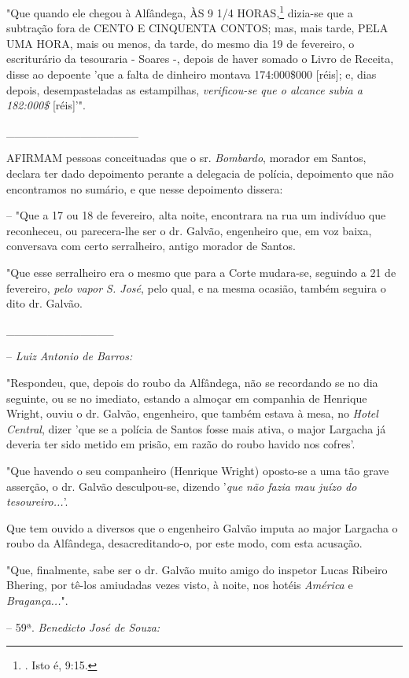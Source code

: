 "Que quando ele chegou à Alfândega, ÀS 9 1/4 HORAS,\footnote{. Isto é,
  9:15.} dizia-se que a subtração fora de CENTO E CINQUENTA CONTOS; mas,
mais tarde, PELA UMA HORA, mais ou menos, da tarde, do mesmo dia 19 de
fevereiro, o escriturário da tesouraria - Soares -, depois de haver
somado o Livro de Receita, disse ao depoente 'que a falta de dinheiro
montava 174:000\$000 {[}réis{]}; e, dias depois, desempasteladas as
estampilhas, \emph{verificou-se que o alcance subia a 182:000\$}
{[}réis{]}'".

\_\_\_\_\_\_\_\_\_\_\_\_\_\_\_\_

AFIRMAM pessoas conceituadas que o sr. \emph{Bombardo}, morador em
Santos, declara ter dado depoimento perante a delegacia de polícia,
depoimento que não encontramos no sumário, e que nesse depoimento
dissera:

-- "Que a 17 ou 18 de fevereiro, alta noite, encontrara na rua um
indivíduo que reconheceu, ou parecera-lhe ser o dr. Galvão, engenheiro
que, em voz baixa, conversava com certo serralheiro, antigo morador de
Santos.

"Que esse serralheiro era o mesmo que para a Corte mudara-se, seguindo a
21 de fevereiro, \emph{pelo vapor S. José}, pelo qual, e na mesma
ocasião, também seguira o dito dr. Galvão.

\_\_\_\_\_\_\_\_\_\_\_\_\_

-- \emph{Luiz} \emph{Antonio de Barros:}

"Respondeu, que, depois do roubo da Alfândega, não se recordando se no
dia seguinte, ou se no imediato, estando a almoçar em companhia de
Henrique Wright, ouviu o dr. Galvão, engenheiro, que também estava à
mesa, no \emph{Hotel Central}, dizer 'que se a polícia de Santos fosse
mais ativa, o major Largacha já deveria ter sido metido em prisão, em
razão do roubo havido nos cofres'.

"Que havendo o seu companheiro (Henrique Wright) oposto-se a uma tão
grave asserção, o dr. Galvão desculpou-se, dizendo '\emph{que não fazia
mau juízo do tesoureiro...}'.

Que tem ouvido a diversos que o engenheiro Galvão imputa ao major
Largacha o roubo da Alfândega, desacreditando-o, por este modo, com esta
acusação.

"Que, finalmente, sabe ser o dr. Galvão muito amigo do inspetor Lucas
Ribeiro Bhering, por tê-los amiudadas vezes visto, à noite, nos hotéis
\emph{América} e \emph{Bragança...}".

-- 59ª. \emph{Benedicto José de Souza:}

